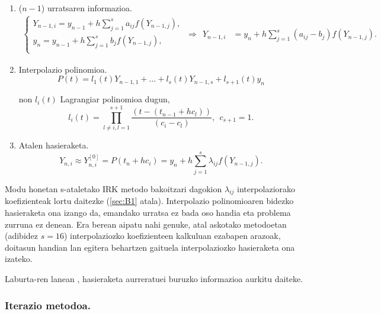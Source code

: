 \begin{enumerate}
\item ($n-1$) urratsaren informazioa.
\begin{align*}
\left \{ \begin{array}{c}
Y_{n-1,i} =y_{n-1}+h \sum\limits_{j=1}^{s} a_{ij} f(Y_{n-1,j}),\\
y_n =y_{n-1}+h \sum\limits_{j=1}^{s} b_j f(Y_{n-1,j}),\\
\end{array} \right.
\ \Rightarrow \ \ 
Y_{n-1,i} &=y_n+h \sum\limits_{j=1}^{s} (a_{ij}-b_j) f(Y_{n-1,j}).
\end{align*}

\item Interpolazio polinomioa.
\begin{equation*}
P(t)=  l_1(t) Y_{n-1,1}+\dots+l_s(t) Y_{n-1,s}+l_{s+1}(t) y_n
\end{equation*}
  
non $l_i(t)$ Lagrangiar polinomioa dugun,
\begin{equation*}
 l_i(t)=\prod_{l\neq i,l=1}^{s+1} \frac{(t-(t_{n-1}+hc_l))}{(c_i-c_l)}, \ \ c_{s+1}=1.
\end{equation*}

\item Atalen hasieraketa.
\begin{equation*}
Y_{n,i} \approx Y_{n,i}^{[0]}= P(t_n+hc_i) = y_n+ h \sum\limits_{j=1}^{s} \lambda_{ij}f(Y_{n-1,j}).
\end{equation*}

\end{enumerate}

Modu honetan s-ataletako IRK metodo bakoitzari dagokion $\lambda_{ij}$ interpolaziorako koefizienteak lortu daitezke (\ref{sec:B1} atala). Interpolazio polinomioaren bidezko hasieraketa ona izango da, emandako urratsa ez bada oso handia eta problema zurruna ez denean. Era berean aipatu nahi genuke, atal askotako metodoetan (adibidez $s=16$)  interpolaziozko koefizienteen kalkuluan ezabapen arazoak, doitasun handian lan egitera behartzen gaituela interpolaziozko hasieraketa ona izateko.   

Laburta-ren lanean \cite{Laburta1998}, hasieraketa aurreratuei buruzko informazioa aurkitu daiteke.  


\subsubsection*{Iterazio metodoa.}

